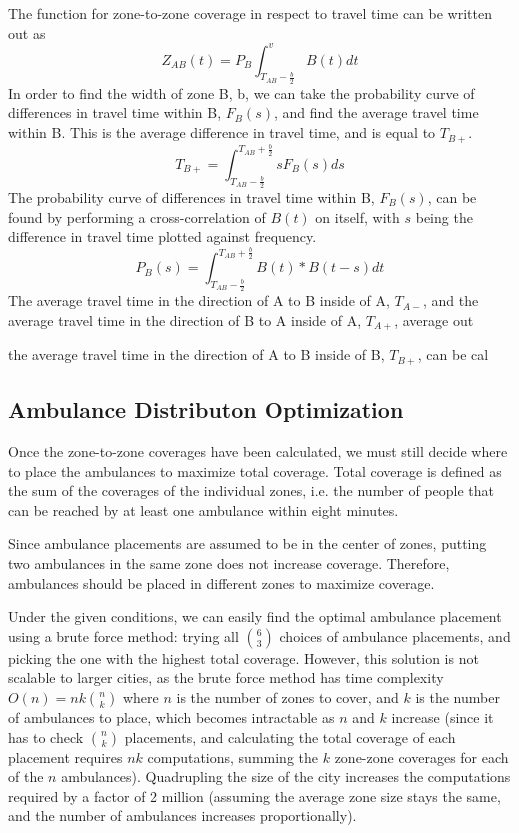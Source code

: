 \documentclass[notitlepage, 12pt]{article}
\begin{document}

The function for zone-to-zone coverage in respect to travel time can be written out as 
$$Z_{AB}(t) = P_B \int^v_{T_{AB} - \frac{b}{2}} B(t) dt$$
In order to find the width of zone B, b, we can take the probability curve of differences in travel time within B, $F_B(s)$, and find the average travel time within B. This is the average difference in travel time, and is equal to $T_{B+}$. 
$$T_{B+} = \int^{T_{AB} + \frac{b}{2}}_{T_{AB} - \frac{b}{2}} s F_B(s) ds$$
The probability curve of differences in travel time within B, $F_B(s)$, can be found by performing a cross-correlation of $B(t)$ on itself, with $s$ being the difference in travel time plotted against frequency.
$$P_B(s) =\int^{T_{AB} + \frac{b}{2}}_{T_{AB} - \frac{b}{2}} B(t) * B(t-s) dt$$
The average travel time in the direction of A to B inside of A, $T_{A-}$, and the average travel time in the direction of B to A inside of A, $T_{A+}$, average out 

the average travel time in the direction of A to B inside of B, $T_{B+}$, can be cal

\subsection{Ambulance Distributon Optimization}
Once the zone-to-zone coverages have been calculated, we must still decide where to place
the ambulances to maximize total coverage. Total coverage is defined as the sum of the coverages
of the individual zones, i.e. the number of people that can be reached by at least one ambulance
within eight minutes.

Since ambulance placements are assumed to be in the center of zones, putting two ambulances in the same
zone does not increase coverage. Therefore, ambulances should be placed in different zones to maximize
coverage.

Under the given conditions, we can easily find the optimal ambulance placement using a brute force
method: trying all $\binom{6}{3}$ choices of ambulance placements, and picking the one with the highest total coverage.
However, this solution is not scalable to larger cities, as the brute force method has time complexity
$O(n) = nk\binom{n}{k}$ where $n$ is the number of zones to cover, and $k$ is the number of ambulances to place, which
becomes intractable as $n$ and $k$ increase (since it has to check $\binom{n}{k}$ placements,
and calculating the total coverage of each placement requires $nk$ computations, summing the $k$ zone-zone
coverages for each of the $n$ ambulances). Quadrupling the size of the city
increases the computations required by a factor of 2 million (assuming the average zone size stays the same,
and the number of ambulances increases proportionally).
\end{document}

